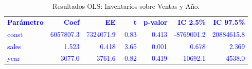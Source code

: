 \begin{table}[H]
\centering
\caption{Resultados OLS: Inventarios sobre Ventas y Año.}
\label{tab:ex8_m2}
\begin{tabular}{lrrrrrr}
\rowcolor{blue!10}
\toprule
\rowcolor{blue!20}
\textcolor{blue}{\textbf{Parámetro}} & \textcolor{blue}{\textbf{Coef}} & \textcolor{blue}{\textbf{EE}} & \textcolor{blue}{\textbf{t}} & \textcolor{blue}{\textbf{p-valor}} & \textcolor{blue}{\textbf{IC 2.5\%}} & \textcolor{blue}{\textbf{IC 97.5\%}} \\
\addlinespace
\rowcolor{blue!10}
\textcolor{blue}{const} & \textcolor{blue}{6057807.3} & \textcolor{blue}{7324071.9} & \textcolor{blue}{0.83} & \textcolor{blue}{0.413} & \textcolor{blue}{-8769001.2} & \textcolor{blue}{20884615.8} \\
\rowcolor{blue!10}
\textcolor{blue}{sales} & \textcolor{blue}{1.523} & \textcolor{blue}{0.418} & \textcolor{blue}{3.65} & \textcolor{blue}{0.001} & \textcolor{blue}{0.678} & \textcolor{blue}{2.369} \\
\rowcolor{blue!10}
\textcolor{blue}{year} & \textcolor{blue}{-3077.0} & \textcolor{blue}{3761.6} & \textcolor{blue}{-0.82} & \textcolor{blue}{0.419} & \textcolor{blue}{-10692.1} & \textcolor{blue}{4538.0} \\
\bottomrule
\end{tabular}
\end{table}
